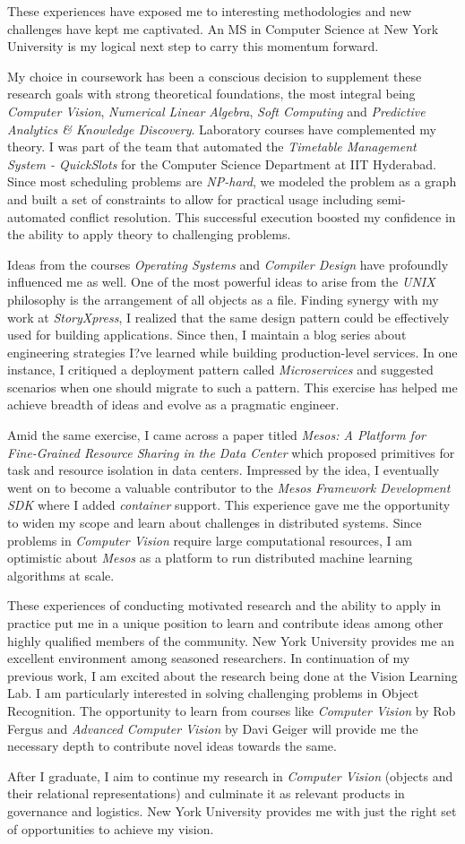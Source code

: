 \documentclass{article}
\begin{document}
\justify
These experiences have exposed me to interesting methodologies and new challenges have kept me captivated. An MS in Computer
Science at New York University is my logical next step to carry this momentum forward.

\justify
My choice in coursework has been a conscious decision to supplement these research goals with strong theoretical foundations,
the most integral being {\it Computer Vision}, {\it Numerical Linear Algebra}, {\it Soft Computing} and
{\it Predictive Analytics \& Knowledge Discovery}. Laboratory courses have complemented my theory. I was part of the team
that automated the {\it Timetable Management System - QuickSlots} for the Computer Science Department at IIT Hyderabad.
Since most scheduling problems are {\it NP-hard}, we modeled the problem as a graph and built a set of constraints to allow
for practical usage including semi-automated conflict resolution. This successful execution boosted my confidence in the
ability to apply theory to challenging problems.

\justify
Ideas from the courses {\it Operating Systems} and {\it Compiler Design} have profoundly influenced me as well. One of
the most powerful ideas to arise from the {\it UNIX} philosophy is the arrangement of all objects as a file. Finding synergy
with my work at {\it StoryXpress}, I realized that the same design pattern could be effectively used for building applications.
Since then, I maintain a blog series about engineering strategies I?ve learned while building production-level services.
In one instance, I critiqued a deployment pattern called {\it Microservices} and suggested scenarios when one should migrate
to such a pattern. This exercise has helped me achieve breadth of ideas and evolve as a pragmatic engineer.

\justify
Amid the same exercise, I came across a paper titled {\it Mesos: A Platform for Fine-Grained Resource Sharing in the Data Center}
which proposed primitives for task and resource isolation in data centers. Impressed by the idea, I eventually went on to
become a valuable contributor to the {\it Mesos Framework Development SDK} where I added {\it container} support. This
experience gave me the opportunity to widen my scope and learn about challenges in distributed systems. Since problems in
{\it Computer Vision} require large computational resources, I am optimistic about {\it Mesos} as a platform to run distributed
machine learning algorithms at scale.

\justify
These experiences of conducting motivated research and the ability to apply in practice put me in a unique position to
learn and contribute ideas among other highly qualified members of the community. New York University provides me an
excellent environment among seasoned researchers. In continuation of my previous work, I am excited about the research
being done at the Vision Learning Lab. I am particularly interested in solving challenging problems in Object Recognition.
The opportunity to learn from courses like {\it Computer Vision} by Rob Fergus and {\it Advanced Computer Vision} by Davi
Geiger will provide me the necessary depth to contribute novel ideas towards the same.

\justify
After I graduate, I aim to continue my research in {\it Computer Vision} (objects and their relational representations)
and culminate it as relevant products in governance and logistics. New York University provides me with just the right
set of opportunities to achieve my vision.
\end{document}
